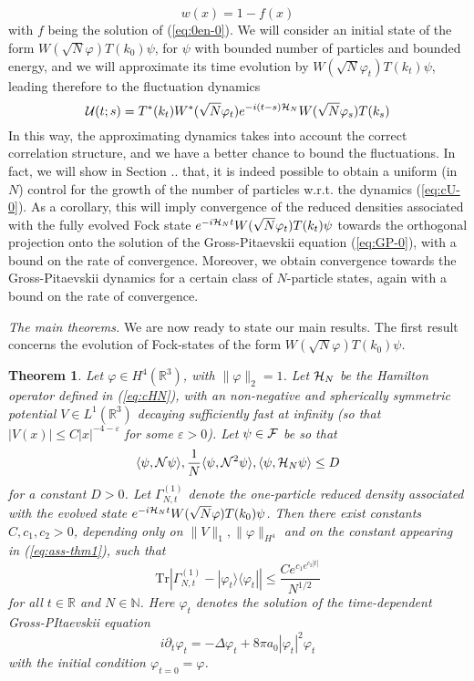 \documentclass[11pt,a4paper,DIV11]{scrartcl}	%
\newtheorem{theorem}{Theorem}[section]
\newcommand{\eps}{\varepsilon}
\newcommand{\cU}{{\cal U}}
\newcommand{\bR}{{\mathbb R}}
\newcommand{\bN}{{\mathbb N}}
\newcommand{\tr}{\mbox{Tr}}
\newcommand{\cF}{{\cal F}}
\newcommand{\cH}{{\cal H}}
\newcommand{\cN}{{\cal N}}
\begin{document}
\[ w (x) = 1 - f(x) \]
with $f$ being the solution of (\ref{eq:0en-0}). We will consider an initial state of the form $W(\sqrt{N} \varphi) T(k_0) \psi$, for $\psi$ with bounded number of particles and bounded energy, and we will approximate its time evolution by $W(\sqrt{N} \varphi_t) T(k_t) \psi$, leading therefore to the fluctuation dynamics 
\begin{equation}\label{eq:cU-0} \cU (t;s) = T^* (k_t) W^* (\sqrt{N} \varphi_t) e^{-i(t-s) \cH_N} W(\sqrt{N} \varphi_s) T(k_s) \end{equation}
In this way, the approximating dynamics takes into account the correct correlation structure, and we have a better chance to bound the fluctuations. In fact, we will show in Section .. that, it is indeed possible to obtain a uniform (in $N$) control for the growth of the number of particles w.r.t. the dynamics (\ref{eq:cU-0}). As a corollary, this will imply convergence of the reduced densities associated with the fully evolved Fock state $e^{-i \cH_N t} W(\sqrt{N} \varphi_t) T(k_t) \psi$ towards the orthogonal projection onto the solution of the Gross-Pitaevskii equation (\ref{eq:GP-0}), with a bound on the rate of convergence. Moreover, we obtain convergence towards the Gross-Pitaevskii dynamics for a certain class of $N$-particle states, again with a bound on the rate of convergence. 

\bigskip

{\it The main theorems.} We are now ready to state our main results. The first result concerns the evolution of Fock-states of the form $W(\sqrt{N} \varphi) T(k_0) \psi$.
\begin{theorem}\label{thm:main}
Let $\varphi \in H^4 (\bR^3)$, with $\| \varphi \|_2 =1$. Let $\cH_N$ be the Hamilton operator defined in (\ref{eq:cHN}), with an non-negative and spherically symmetric potential $V \in L^1 (\bR^3)$ decaying sufficiently fast at infinity (so that $|V(x)| \leq C |x|^{-4-\eps}$ for some $\eps > 0$). Let $\psi \in \cF$ be so that
\begin{equation}\label{eq:ass-thm1} \langle \psi , \cN \psi \rangle ,  \frac{1}{N} \langle \psi , \cN^2 \psi \rangle, \langle \psi, \cH_N \psi \rangle \leq D \end{equation}
for a constant $D>0$. Let $\Gamma_{N,t}^{(1)}$ denote the one-particle reduced density associated with the evolved state $e^{-i\cH_N t} W(\sqrt{N} \varphi) T(k_0) \psi$. Then there exist constants $C, c_1, c_2 >0$, depending only on $\| V \|_1, \| \varphi \|_{H^4}$ and on the constant appearing in (\ref{eq:ass-thm1}), such that
\[ \tr \left| \Gamma_{N,t}^{(1)} - |\varphi_t\rangle \langle \varphi_t| \right| \leq \frac{C e^{c_1 e^{c_2 |t|}}}{N^{1/2}} \]
for all $t \in \bR$ and $N \in \bN$. Here $\varphi_t$ denotes the solution of the time-dependent Gross-PItaevskii equation
\begin{equation}\label{eq:GP} i\partial_t \varphi_t = -\Delta \varphi_t + 8 \pi a_0 |\varphi_t|^2 \varphi_t \end{equation}
with the initial condition $\varphi_{t=0} =\varphi$.
\end{theorem}
\end{document}
